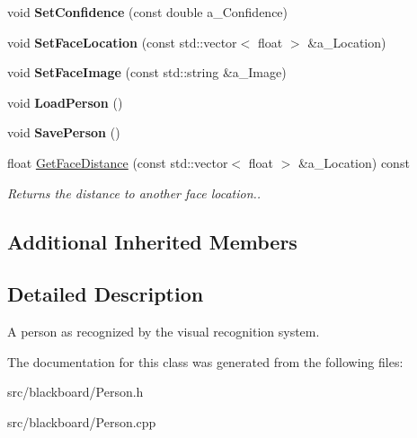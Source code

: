 \begin{DoxyCompactItemize}
void {\bfseries Set\+Confidence} (const double a\+\_\+\+Confidence)
\item 
\mbox{\label{class_person_afb2dc47be93f7c65b2b9068a53616220}} 
void {\bfseries Set\+Face\+Location} (const std\+::vector$<$ float $>$ \&a\+\_\+\+Location)
\item 
\mbox{\label{class_person_a07a75eb9acbfa27d85f30cf5a21852f6}} 
void {\bfseries Set\+Face\+Image} (const std\+::string \&a\+\_\+\+Image)
\item 
\mbox{\label{class_person_a59ffd28980d7e5771ab05f2ae1432098}} 
void {\bfseries Load\+Person} ()
\item 
\mbox{\label{class_person_a3c554d2a581b99664aa3381826061e56}} 
void {\bfseries Save\+Person} ()
\item 
\mbox{\label{class_person_afc0b4a1db118fedafcbfe269b0304bb3}} 
float \hyperlink{class_person_afc0b4a1db118fedafcbfe269b0304bb3}{Get\+Face\+Distance} (const std\+::vector$<$ float $>$ \&a\+\_\+\+Location) const
\begin{DoxyCompactList}\small\item\em Returns the distance to another face location.. \end{DoxyCompactList}\end{DoxyCompactItemize}
\subsection*{Additional Inherited Members}


\subsection{Detailed Description}
A person as recognized by the visual recognition system. 

The documentation for this class was generated from the following files\+:\begin{DoxyCompactItemize}
\item 
src/blackboard/Person.\+h\item 
src/blackboard/Person.\+cpp\end{DoxyCompactItemize}
